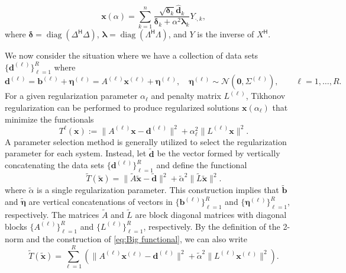 \documentclass[12pt]{article}
\newcommand{\bVec}{\mathbf{b}}	%
\newcommand{\dVec}{\mathbf{d}}	%
\newcommand{\xVec}{\mathbf{x}}	%
\newcommand{\ctrans}[1]{{#1}^\mathsf{H}}	%
\DeclareMathOperator{\diag}{diag}	%
\newcommand{\regparam}{\alpha}
\newcommand{\noise}{\eta}	%
\newcommand{\noiseVec}{\bm{\noise}}	%
\newcommand{\svd}[1]{\widehat{#1}}	%
\begin{document}
\begin{equation}
\xVec(\regparam) = \sum_{k = 1}^{n} \frac{\sqrt{\bm{\delta}_k} \svd{\dVec}_k}{\bm{\delta}_k + \regparam^2\bm{\lambda}_k}Y_{\cdot,k},
\end{equation}
where $\bm{\delta} = \diag(\ctrans{\Delta}\Delta)$, $\bm{\lambda} = \diag(\ctrans{\Lambda}\Lambda)$, and $Y$ is the inverse of $\ctrans{X}$. \par
We now consider the situation where we have a collection of data sets $\{\dVec^{(\ell)}\}_{\ell=1}^R$ where 
\begin{equation}
\label{eq:Big vectors}
\dVec^{(\ell)} = \bVec^{(\ell)} + \noiseVec^{(\ell)} = {A^{(\ell)}}\xVec^{(\ell)} + \noiseVec^{(\ell)}, \quad \noiseVec^{(\ell)} \sim \mathcal{N}(\bm{0},\Sigma^{(\ell)}), \qquad \ell = 1,\ldots,R.
\end{equation}
For a given regularization parameter $\regparam_\ell$ and penalty matrix $L^{(\ell)}$, Tikhonov regularization can be performed to produce regularized solutions $\xVec(\regparam_\ell)$ that minimize the functionals
\begin{equation}
T^\ell(\xVec) := \|A^{(\ell)}\xVec - \dVec^{(\ell)}\|^2 + \regparam_\ell^2\|L^{(\ell)}\xVec\|^2.
\end{equation}
A parameter selection method is generally utilized to select the regularization parameter for each system. Instead, let $\widetilde{\dVec}$ be the vector formed by vertically concatenating the data sets $\{\dVec^{(\ell)}\}_{\ell=1}^R$ and define the functional
\begin{equation}
\label{eq:Big functional}
\widetilde{T}(\widetilde{\xVec}) = \|\widetilde{A}\widetilde{\xVec} - \widetilde{\dVec}\|^2 + \widetilde{\regparam}^2\|\widetilde{L}\widetilde{\xVec}\|^2.
\end{equation}
where $\widetilde{\regparam}$ is a single regularization parameter. This construction implies that $\widetilde{\bVec}$ and $\widetilde{\noiseVec}$ are vertical concatenations of vectors in $\{\bVec^{(\ell)}\}_{\ell=1}^R$ and $\{\noiseVec^{(\ell)}\}_{\ell=1}^R$, respectively. The matrices $\widetilde{A}$ and $\widetilde{L}$ are block diagonal matrices with diagonal blocks $\{A^{(\ell)}\}_{\ell=1}^R$ and $\{L^{(\ell)}\}_{\ell=1}^R$, respectively. By the definition of the 2-norm and the construction of \eqref{eq:Big functional}, we can also write
\begin{equation}
\label{eq:Big functional 2}
\widetilde{T}(\widetilde{\xVec}) = \sum_{\ell = 1}^R \left(\|A^{(\ell)}\xVec^{(\ell)} - \dVec^{(\ell)}\|^2 + \widetilde{\regparam}^2\|L^{(\ell)} \xVec^{(\ell)}\|^2\right).
\end{equation}
\end{document}
